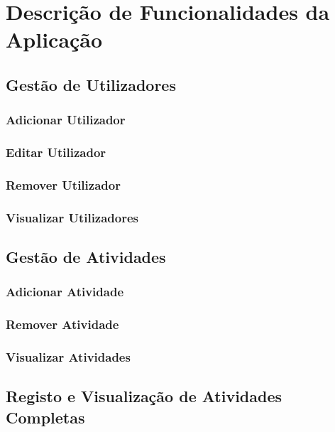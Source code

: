 \documentclass[a4paper,12pt]{scrreprt}
\begin{document}


\chapter{Descrição de Funcionalidades da Aplicação}

\section{Gestão de Utilizadores}
    \subsection{Adicionar Utilizador}
    \subsection{Editar Utilizador}
    \subsection{Remover Utilizador}
    \subsection{Visualizar Utilizadores}

\section{Gestão de Atividades}
    \subsection{Adicionar Atividade}
    \subsection{Remover Atividade}
    \subsection{Visualizar Atividades}

\section{Registo e Visualização de Atividades Completas}
\end{document}
